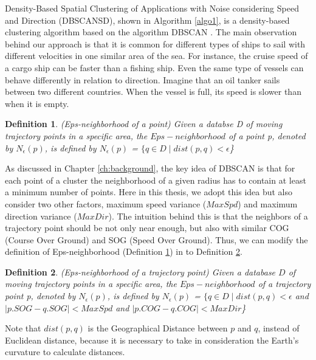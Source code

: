 \documentclass[12pt,glossary]{dalcsthesis}
\newtheorem{definition}{Definition}
\begin{document}
Density-Based Spatial Clustering of Applications with Noise considering Speed and Direction (DBSCANSD), shown in Algorithm \ref{algo1}, is a density-based clustering algorithm based on the algorithm DBSCAN \cite{DBScan96}. The main observation behind our approach is that it is common for different types of ships to sail with different velocities in one similar area of the sea. For instance, the cruise speed of a cargo ship can be faster than a fishing ship. Even the same type of vessels can behave differently in relation to direction. Imagine that an oil tanker sails between two different countries. When the vessel is full, its speed is slower than when it is empty. 

\begin{definition}
\label{def:epsneighborhood_old}
(Eps-neighborhood of a point) Given a databse D of moving trajectory points in a specific area, the $Eps-neighborhood$ of a point p, denoted by $N_{\epsilon}(p)$, is defined by $N_{\epsilon}(p)$ = $\{ q\in D \mid dist(p, q) < \epsilon$\}
\end{definition}


As discussed in Chapter \ref{ch:background}, the key idea of DBSCAN \cite{DBScan96} is that for each point of a cluster the neighborhood of a given radius has to contain at least a minimum number of points. Here in this thesis, we adopt this idea but also consider two other factors, maximum speed variance ($MaxSpd$) and maximum direction variance ($MaxDir$). The intuition behind this is that the neighbors of a trajectory point should be not only near enough, but also with similar COG (Course Over Ground) and SOG (Speed Over Ground). Thus, we can modify the definition of Eps-neighborhood (Definition \ref{def:epsneighborhood_old}) in \cite{DBScan96} to Definition \ref{def:epsneighborhood_new}.


\begin{definition}
\label{def:epsneighborhood_new}
(Eps-neighborhood of a trajectory point)
Given a database $D$ of moving trajectory points in a specific area, the $Eps-neighborhood$ of a trajectory point p, denoted by $N_{\epsilon}(p)$, is defined by $N_{\epsilon}(p)$ = $\{ q\in D \mid dist(p, q) < \epsilon$ and $\left|p.SOG-q.SOG\right|<MaxSpd$ and $\left|p.COG-q.COG\right|<MaxDir$\}
\end{definition}


Note that $dist(p,q)$ is the Geographical Distance \cite{gpsDistance} between $p$ and $q$, instead of Euclidean distance, because it is necessary to take in consideration the Earth's curvature to calculate distances.
\end{document}
